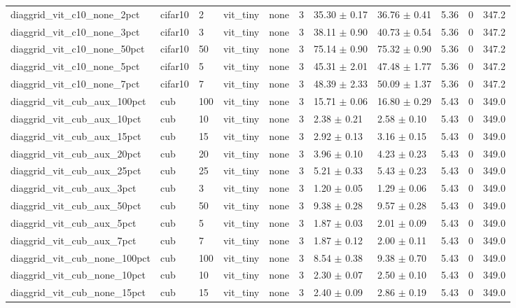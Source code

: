 \begin{tabular}{lllllllllll}
diaggrid_vit_c10_none_2pct & cifar10 & 2 & vit_tiny & none & 3 & 35.30 $\pm$ 0.17 & 36.76 $\pm$ 0.41 & 5.36 & 0 & 347.2 \\
diaggrid_vit_c10_none_3pct & cifar10 & 3 & vit_tiny & none & 3 & 38.11 $\pm$ 0.90 & 40.73 $\pm$ 0.54 & 5.36 & 0 & 347.2 \\
diaggrid_vit_c10_none_50pct & cifar10 & 50 & vit_tiny & none & 3 & 75.14 $\pm$ 0.90 & 75.32 $\pm$ 0.90 & 5.36 & 0 & 347.2 \\
diaggrid_vit_c10_none_5pct & cifar10 & 5 & vit_tiny & none & 3 & 45.31 $\pm$ 2.01 & 47.48 $\pm$ 1.77 & 5.36 & 0 & 347.2 \\
diaggrid_vit_c10_none_7pct & cifar10 & 7 & vit_tiny & none & 3 & 48.39 $\pm$ 2.33 & 50.09 $\pm$ 1.37 & 5.36 & 0 & 347.2 \\
diaggrid_vit_cub_aux_100pct & cub & 100 & vit_tiny & none & 3 & 15.71 $\pm$ 0.06 & 16.80 $\pm$ 0.29 & 5.43 & 0 & 349.0 \\
diaggrid_vit_cub_aux_10pct & cub & 10 & vit_tiny & none & 3 & 2.38 $\pm$ 0.21 & 2.58 $\pm$ 0.10 & 5.43 & 0 & 349.0 \\
diaggrid_vit_cub_aux_15pct & cub & 15 & vit_tiny & none & 3 & 2.92 $\pm$ 0.13 & 3.16 $\pm$ 0.15 & 5.43 & 0 & 349.0 \\
diaggrid_vit_cub_aux_20pct & cub & 20 & vit_tiny & none & 3 & 3.96 $\pm$ 0.10 & 4.23 $\pm$ 0.23 & 5.43 & 0 & 349.0 \\
diaggrid_vit_cub_aux_25pct & cub & 25 & vit_tiny & none & 3 & 5.21 $\pm$ 0.33 & 5.43 $\pm$ 0.23 & 5.43 & 0 & 349.0 \\
diaggrid_vit_cub_aux_3pct & cub & 3 & vit_tiny & none & 3 & 1.20 $\pm$ 0.05 & 1.29 $\pm$ 0.06 & 5.43 & 0 & 349.0 \\
diaggrid_vit_cub_aux_50pct & cub & 50 & vit_tiny & none & 3 & 9.38 $\pm$ 0.28 & 9.57 $\pm$ 0.28 & 5.43 & 0 & 349.0 \\
diaggrid_vit_cub_aux_5pct & cub & 5 & vit_tiny & none & 3 & 1.87 $\pm$ 0.03 & 2.01 $\pm$ 0.09 & 5.43 & 0 & 349.0 \\
diaggrid_vit_cub_aux_7pct & cub & 7 & vit_tiny & none & 3 & 1.87 $\pm$ 0.12 & 2.00 $\pm$ 0.11 & 5.43 & 0 & 349.0 \\
diaggrid_vit_cub_none_100pct & cub & 100 & vit_tiny & none & 3 & 8.54 $\pm$ 0.38 & 9.38 $\pm$ 0.70 & 5.43 & 0 & 349.0 \\
diaggrid_vit_cub_none_10pct & cub & 10 & vit_tiny & none & 3 & 2.30 $\pm$ 0.07 & 2.50 $\pm$ 0.10 & 5.43 & 0 & 349.0 \\
diaggrid_vit_cub_none_15pct & cub & 15 & vit_tiny & none & 3 & 2.40 $\pm$ 0.09 & 2.86 $\pm$ 0.19 & 5.43 & 0 & 349.0 \\

\end{tabular}
